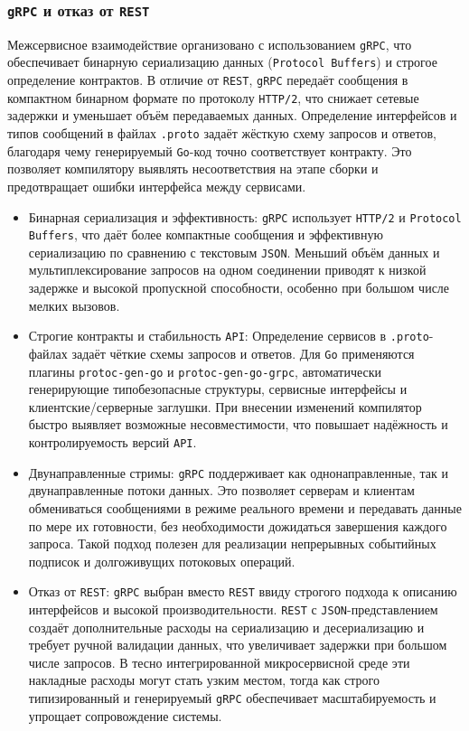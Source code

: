 \subsubsection*{\texttt{gRPC} и отказ от \texttt{REST}}
Межсервисное взаимодействие организовано с использованием \texttt{gRPC}, что обеспечивает бинарную сериализацию данных (\texttt{Protocol Buffers}) и строгое определение контрактов. В отличие от \texttt{REST}, \texttt{gRPC} передаёт сообщения в компактном бинарном формате по протоколу \texttt{HTTP/2}, что снижает сетевые задержки и уменьшает объём передаваемых данных. Определение интерфейсов и типов сообщений в файлах \texttt{.proto} задаёт жёсткую схему запросов и ответов, благодаря чему генерируемый \texttt{Go}-код точно соответствует контракту. Это позволяет компилятору выявлять несоответствия на этапе сборки и предотвращает ошибки интерфейса между сервисами.
\begin{itemize}
    \item Бинарная сериализация и эффективность: \texttt{gRPC} использует \texttt{HTTP/2} и \texttt{Protocol Buffers}, что даёт более компактные сообщения и эффективную сериализацию по сравнению с текстовым \texttt{JSON}. Меньший объём данных и мультиплексирование запросов на одном соединении приводят к низкой задержке и высокой пропускной способности, особенно при большом числе мелких вызовов.
    \item Строгие контракты и стабильность \texttt{API}: Определение сервисов в \texttt{.proto}-файлах задаёт чёткие схемы запросов и ответов. Для \texttt{Go} применяются плагины \texttt{protoc-gen-go} и \texttt{protoc-gen-go-grpc}, автоматически генерирующие типобезопасные структуры, сервисные интерфейсы и клиентские/серверные заглушки. При внесении изменений компилятор быстро выявляет возможные несовместимости, что повышает надёжность и контролируемость версий \texttt{API}.
    \item Двунаправленные стримы: \texttt{gRPC} поддерживает как однонаправленные, так и двунаправленные потоки данных. Это позволяет серверам и клиентам обмениваться сообщениями в режиме реального времени и передавать данные по мере их готовности, без необходимости дожидаться завершения каждого запроса. Такой подход полезен для реализации непрерывных событийных подписок и долгоживущих потоковых операций.
    \item Отказ от \texttt{REST}: \texttt{gRPC} выбран вместо \texttt{REST} ввиду строгого подхода к описанию интерфейсов и высокой производительности. \texttt{REST} с \texttt{JSON}-представлением создаёт дополнительные расходы на сериализацию и десериализацию и требует ручной валидации данных, что увеличивает задержки при большом числе запросов. В тесно интегрированной микросервисной среде эти накладные расходы могут стать узким местом, тогда как строго типизированный и генерируемый \texttt{gRPC} обеспечивает масштабируемость и упрощает сопровождение системы.
\end{itemize}

